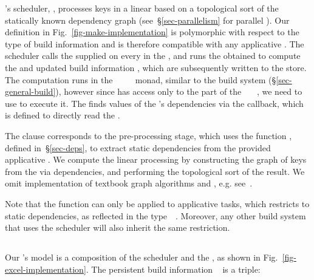 \Make's scheduler, , processes keys in a linear  based on a
topological sort of the statically known dependency graph
(see~\S\ref{sec-parallelism} for parallel \Make). Our definition in
Fig.~\ref{fig-make-implementation} is polymorphic with respect to the type of
build information  and is therefore compatible with any applicative
. The scheduler calls the supplied  on every
 in the , and runs the obtained  to compute the
 and updated build information , which are subsequently
written to the store. The computation runs in the
~~~~ monad, similar to the 
build system (\S\ref{sec-general-build}), however since  has access
only to the  part of the ~~~, we need to use
 to execute it. The  finds values of the 's
dependencies via the  callback, which is defined to directly read the
.

The  clause corresponds to the pre-processing stage, which uses the
function , defined in~\S\ref{sec-deps}, to extract static
dependencies from the provided applicative . We compute the linear
processing  by constructing the graph of keys  from the
 via dependencies, and performing the topological sort of the result.
We omit implementation of textbook graph algorithms
 and , e.g. see~\cite{cormen2001introduction}.

Note that the function  can only be applied to applicative
tasks, which restricts \Make to static dependencies, as reflected in the
type~~. Moreover, any other build system that uses
the  scheduler will also inherit the same restriction.

\subsection{\Excel}\label{sec-implementation-excel}

Our \Excel's model is a composition of the  scheduler and the
, as shown in Fig.~\ref{fig-excel-implementation}.
The persistent build information ~ is a triple:

